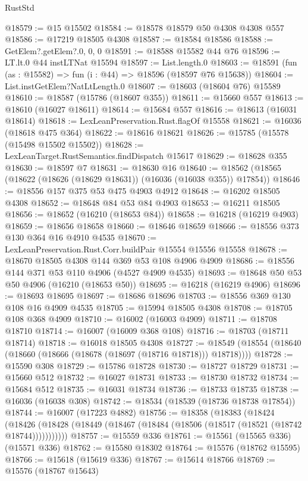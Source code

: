 \begin{lexlean}{RustStd}
\begin{coremodule}
@18579 := @15 @15502
@18584 := @18578 @18579 @50 @4308 @4308 @557
@18586 := @17219 @18505 @4308
@18587 := @18584 @18586
@18588 := GetElem?.getElem?.{0, 0, 0}
@18591 := @18588 @15582 @44 @76
@18596 := LT.lt.{0} @44 instLTNat @15594
@18597 := List.length.{0}
@18603 := @18591 (fun (as : @15582) => fun (i : @44) => @18596 (@18597 @76 @15638))
@18604 := List.instGetElem?NatLtLength.{0}
@18607 := @18603 (@18604 @76) @15589
@18610 := @18587 (@15786 (@18607 @355))
@18611 := @15660 @557
@18613 := @18610 (@16027 @18611)
@18614 := @15684 @557
@18616 := @18613 (@16031 @18614)
@18618 := LexLeanPreservation.Rust.flagOf @15558
@18621 := @16036 (@18618 @475 @364)
@18622 := @18616 @18621
@18626 := @15785 (@15578 (@15498 @15502 @15502))
@18628 := LexLeanTarget.RustSemantics.findDispatch @15617
@18629 := @18628 @355
@18630 := @18597 @7
@18631 := @18630 @16
@18640 := @18562 (@18565 (@18622 (@18626 (@18629 @18631)) (@16036 (@16038 @355)) @17854))
@18646 := @18556 @157 @375 @53 @475 @4903 @4912
@18648 := @16202 @18505 @4308
@18652 := @18648 @84 @53 @84 @4903
@18653 := @16211 @18505
@18656 := @18652 (@16210 (@18653 @84))
@18658 := @16218 (@16219 @4903)
@18659 := @18656 @18658
@18660 := @18646 @18659
@18666 := @18556 @373 @130 @364 @16 @4910 @4535
@18670 := LexLeanPreservation.Rust.Corr.buildPair @15554 @15556 @15558
@18678 := @18670 @18505 @4308 @144 @369 @53 @108 @4906 @4909
@18686 := @18556 @144 @371 @53 @110 @4906 (@4527 @4909 @4535)
@18693 := @18648 @50 @53 @50 @4906 (@16210 (@18653 @50))
@18695 := @16218 (@16219 @4906)
@18696 := @18693 @18695
@18697 := @18686 @18696
@18703 := @18556 @369 @130 @108 @16 @4909 @4535
@18705 := @15994 @18505 @4308
@18708 := @18705 @108 @368 @4909
@18710 := @16002 (@16003 @4909)
@18711 := @18708 @18710
@18714 := @16007 (@16009 @368 @108)
@18716 := @18703 (@18711 @18714)
@18718 := @16018 @18505 @4308
@18727 := @18549 (@18554 (@18640 (@18660 (@18666 (@18678 (@18697 (@18716 @18718))) @18718))))
@18728 := @15590 @308
@18729 := @15786 @18728
@18730 := @18727 @18729
@18731 := @15660 @512
@18732 := @16027 @18731
@18733 := @18730 @18732
@18734 := @15684 @512
@18735 := @16031 @18734
@18736 := @18733 @18735
@18738 := @16036 (@16038 @308)
@18742 := @18534 (@18539 (@18736 @18738 @17854))
@18744 := @16007 (@17223 @4882)
@18756 := @18358
    (@18383
      (@18424
        (@18426 (@18428 (@18449 (@18467 (@18484 (@18506 (@18517 (@18521 (@18742 @18744)))))))))))
@18757 := @15559 @336
@18761 := @15561 (@15565 @336) (@15571 @336)
@18762 := @15580 @18302
@18764 := @15576 (@18762 @15595)
@18766 := @15618 (@15619 @336)
@18767 := @15614 @18766
@18769 := @15576 (@18767 @15643)

\end{coremodule}
\end{lexlean}
